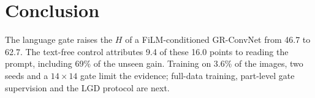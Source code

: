 \section{Conclusion}
The language gate raises the $H$ of a FiLM-conditioned GR-ConvNet from 46.7 to 62.7. The text-free control attributes 9.4 of these 16.0 points to reading the prompt, including 69\% of the unseen gain. Training on 3.6\% of the images, two seeds and a $14{\times}14$ gate limit the evidence; full-data training, part-level gate supervision and the LGD protocol are next.

